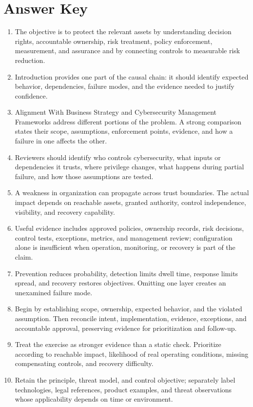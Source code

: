 \documentclass[11pt,letterpaper]{article}
\begin{document}
\section*{Answer Key}
\begin{enumerate}
\item The objective is to protect the relevant assets by understanding decision rights, accountable ownership, risk treatment, policy enforcement, measurement, and assurance and by connecting controls to measurable risk reduction.
\item Introduction provides one part of the causal chain: it should identify expected behavior, dependencies, failure modes, and the evidence needed to justify confidence.
\item Alignment With Business Strategy and Cybersecurity Management Frameworks address different portions of the problem. A strong comparison states their scope, assumptions, enforcement points, evidence, and how a failure in one affects the other.
\item Reviewers should identify who controls cybersecurity, what inputs or dependencies it trusts, where privilege changes, what happens during partial failure, and how those assumptions are tested.
\item A weakness in organization can propagate across trust boundaries. The actual impact depends on reachable assets, granted authority, control independence, visibility, and recovery capability.
\item Useful evidence includes approved policies, ownership records, risk decisions, control tests, exceptions, metrics, and management review; configuration alone is insufficient when operation, monitoring, or recovery is part of the claim.
\item Prevention reduces probability, detection limits dwell time, response limits spread, and recovery restores objectives. Omitting one layer creates an unexamined failure mode.
\item Begin by establishing scope, ownership, expected behavior, and the violated assumption. Then reconcile intent, implementation, evidence, exceptions, and accountable approval, preserving evidence for prioritization and follow-up.
\item Treat the exercise as stronger evidence than a static check. Prioritize according to reachable impact, likelihood of real operating conditions, missing compensating controls, and recovery difficulty.
\item Retain the principle, threat model, and control objective; separately label technologies, legal references, product examples, and threat observations whose applicability depends on time or environment.
\end{enumerate}
\end{document}
